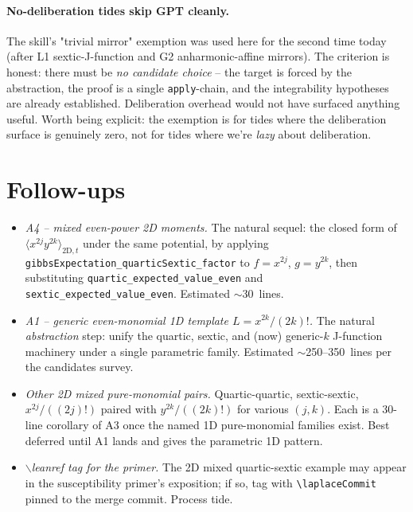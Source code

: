 \documentclass[11pt]{article}
\begin{document}
\paragraph{No-deliberation tides skip GPT cleanly.}
The skill's "trivial mirror" exemption was used here for the second
time today (after L1 sextic-J-function and G2 anharmonic-affine
mirrors). The criterion is honest: there must be \emph{no candidate
choice} -- the target is forced by the abstraction, the proof is a
single \texttt{apply}-chain, and the integrability hypotheses are
already established. Deliberation overhead would not have surfaced
anything useful. Worth being explicit: the exemption is for tides
where the deliberation surface is genuinely zero, not for tides where
we're \emph{lazy} about deliberation.

\section{Follow-ups}

\begin{itemize}[leftmargin=2em]
\item \emph{A4 -- mixed even-power 2D moments.} The natural sequel:
the closed form of $\langle x^{2j} y^{2k} \rangle_{\mathrm{2D}, t}$
under the same potential, by applying
\texttt{gibbsExpectation\_quarticSextic\_factor} to
$f = x^{2j}$, $g = y^{2k}$, then substituting
\texttt{quartic\_expected\_value\_even} and
\texttt{sextic\_expected\_value\_even}. Estimated $\sim$30~lines.

\item \emph{A1 -- generic even-monomial 1D template
$L = x^{2k}/(2k)!$.} The natural \emph{abstraction} step: unify the
quartic, sextic, and (now) generic-$k$ J-function machinery under a
single parametric family. Estimated $\sim$250--350~lines per the
candidates survey.

\item \emph{Other 2D mixed pure-monomial pairs.} Quartic-quartic,
sextic-sextic, $x^{2j}/( (2j)!)$ paired with $y^{2k}/((2k)!)$ for
various $(j, k)$. Each is a 30-line corollary of A3 once the named
1D pure-monomial families exist. Best deferred until A1 lands and
gives the parametric 1D pattern.

\item \emph{$\backslash$leanref tag for the primer.} The
2D mixed quartic-sextic example may appear in the susceptibility
primer's exposition; if so, tag with
\texttt{\textbackslash laplaceCommit} pinned to the merge commit.
Process tide.
\end{itemize}
\end{document}
